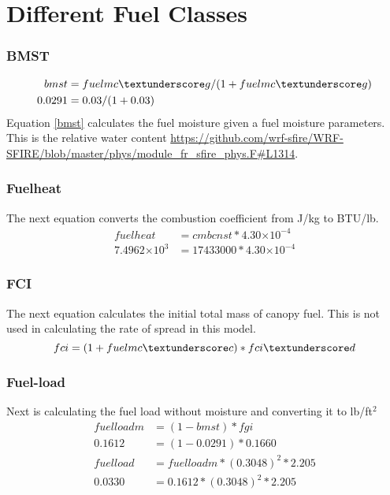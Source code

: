 \documentclass{article}
\newcommand\tenpow[1]{\ensuremath{{\times}10^{#1}}}
\begin{document}
\section{Different Fuel Classes}



\iffalse

\subsubsection{BMST}

\begin{equation}
\label{bmst}
\begin{split}
	bmst &= fuelmc \textunderscore g / (1 + fuelmc \textunderscore g) \\
	0.0291 &= 0.03 / (1 + 0.03)
\end{split}
\end{equation}
Equation \ref{bmst} calculates the fuel moisture given a fuel moisture parameters. This is the relative water content \url{https://github.com/wrf-sfire/WRF-SFIRE/blob/master/phys/module_fr_sfire_phys.F#L1314}.
\\
\subsubsection{Fuelheat}
\noindent The next equation converts the combustion coefficient from J/kg to BTU/lb.
\begin{equation}
	\label{fuelheat}
	\begin{split}
		fuelheat &= cmbcnst * 4.30\tenpow{-4} \\
		7.4962 \tenpow{3} &= 17433000 * 4.30\tenpow{-4}
	\end{split}
\end{equation}

\subsubsection{FCI}
	The next equation calculates the initial total mass of canopy fuel. This is not used in calculating the rate of spread in this model. 
\begin{equation}
	\label{fci}
	fci = (1 + fuelmc \textunderscore c) * fci \textunderscore d
\end{equation}


\subsubsection{Fuel-load}
Next is calculating the fuel load without moisture and converting it to lb/ft$^2$
\begin{equation}
	\label{fuelloadm}
	\begin{split}
		fuelloadm &= (1 - bmst) * fgi \\
		0.1612 &= (1 - 0.0291) * 0.1660 \\
		fuelload &= fuelloadm * (0.3048)^2 * 2.205 \\
		0.0330 &= 0.1612 * (0.3048) ^ 2 * 2.205
	\end{split}
\end{equation}
\end{document}

